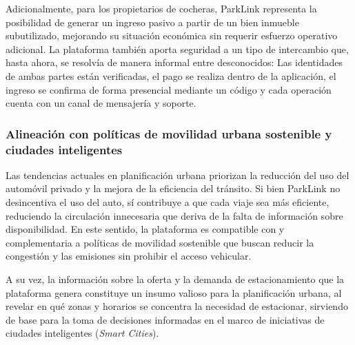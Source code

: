Adicionalmente, para los propietarios de cocheras, ParkLink representa la posibilidad de generar un ingreso pasivo a partir de un bien inmueble subutilizado, mejorando su situación económica sin requerir esfuerzo operativo adicional. La plataforma también aporta seguridad a un tipo de intercambio que, hasta ahora, se resolvía de manera informal entre desconocidos: Las identidades de ambas partes están verificadas, el pago se realiza dentro de la aplicación, el ingreso se confirma de forma presencial mediante un código y cada operación cuenta con un canal de mensajería y soporte.

\subsubsection{Alineación con políticas de movilidad urbana sostenible y ciudades inteligentes}

Las tendencias actuales en planificación urbana priorizan la reducción del uso del automóvil privado y la mejora de la eficiencia del tránsito. Si bien ParkLink no desincentiva el uso del auto, sí contribuye a que cada viaje sea más eficiente, reduciendo la circulación innecesaria que deriva de la falta de información sobre disponibilidad. En este sentido, la plataforma es compatible con y complementaria a políticas de movilidad sostenible que buscan reducir la congestión y las emisiones sin prohibir el acceso vehicular.

A su vez, la información sobre la oferta y la demanda de estacionamiento que la plataforma genera constituye un insumo valioso para la planificación urbana, al revelar en qué zonas y horarios se concentra la necesidad de estacionar, sirviendo de base para la toma de decisiones informadas en el marco de iniciativas de ciudades inteligentes (\textit{Smart Cities}).
